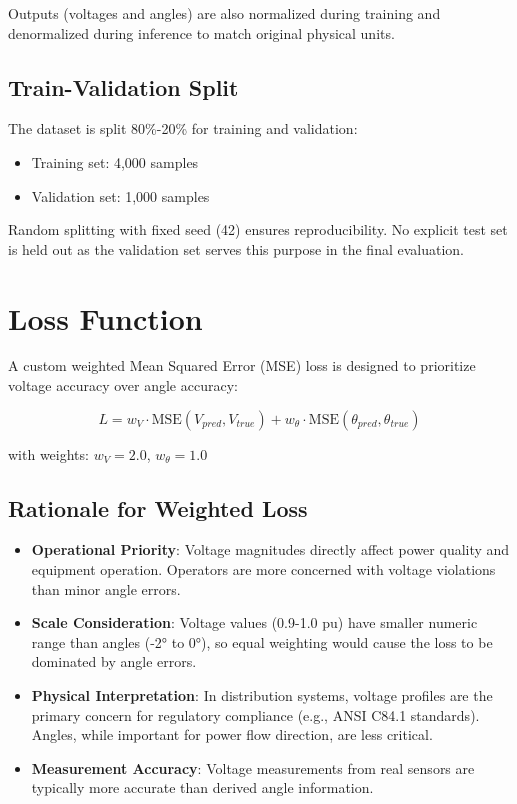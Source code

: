 \documentclass[12pt,a4paper]{report}
\begin{document}
Outputs (voltages and angles) are also normalized during training and denormalized during inference to match original physical units.

\subsection{Train-Validation Split}

The dataset is split 80\%-20\% for training and validation:
\begin{itemize}
    \item Training set: 4,000 samples
    \item Validation set: 1,000 samples
\end{itemize}

Random splitting with fixed seed (42) ensures reproducibility. No explicit test set is held out as the validation set serves this purpose in the final evaluation.

\section{Loss Function}

A custom weighted Mean Squared Error (MSE) loss is designed to prioritize voltage accuracy over angle accuracy:

\begin{equation}
    L = w_V \cdot \text{MSE}(V_{pred}, V_{true}) + w_\theta \cdot \text{MSE}(\theta_{pred}, \theta_{true})
\end{equation}

with weights: $w_V = 2.0$, $w_\theta = 1.0$

\subsection{Rationale for Weighted Loss}

\begin{itemize}
    \item \textbf{Operational Priority}: Voltage magnitudes directly affect power quality and equipment operation. Operators are more concerned with voltage violations than minor angle errors.
    
    \item \textbf{Scale Consideration}: Voltage values (0.9-1.0 pu) have smaller numeric range than angles (-2° to 0°), so equal weighting would cause the loss to be dominated by angle errors.
    
    \item \textbf{Physical Interpretation}: In distribution systems, voltage profiles are the primary concern for regulatory compliance (e.g., ANSI C84.1 standards). Angles, while important for power flow direction, are less critical.
    
    \item \textbf{Measurement Accuracy}: Voltage measurements from real sensors are typically more accurate than derived angle information.
\end{itemize}
\end{document}

